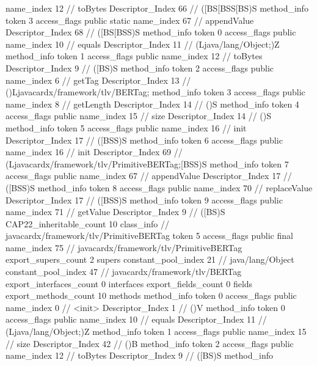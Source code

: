 {{{{{					name_index	12		// toBytes
					Descriptor_Index	66		// ([BS[BSS[BS)S
				}
				method_info {
					token	3
					access_flags	public static
					name_index	67		// appendValue
					Descriptor_Index	68		// ([BS[BSS)S
				}
				method_info {
					token	0
					access_flags	public
					name_index	10		// equals
					Descriptor_Index	11		// (Ljava/lang/Object;)Z
				}
				method_info {
					token	1
					access_flags	public
					name_index	12		// toBytes
					Descriptor_Index	9		// ([BS)S
				}
				method_info {
					token	2
					access_flags	public
					name_index	6		// getTag
					Descriptor_Index	13		// ()Ljavacardx/framework/tlv/BERTag;
				}
				method_info {
					token	3
					access_flags	public
					name_index	8		// getLength
					Descriptor_Index	14		// ()S
				}
				method_info {
					token	4
					access_flags	public
					name_index	15		// size
					Descriptor_Index	14		// ()S
				}
				method_info {
					token	5
					access_flags	public
					name_index	16		// init
					Descriptor_Index	17		// ([BSS)S
				}
				method_info {
					token	6
					access_flags	public
					name_index	16		// init
					Descriptor_Index	69		// (Ljavacardx/framework/tlv/PrimitiveBERTag;[BSS)S
				}
				method_info {
					token	7
					access_flags	public
					name_index	67		// appendValue
					Descriptor_Index	17		// ([BSS)S
				}
				method_info {
					token	8
					access_flags	public
					name_index	70		// replaceValue
					Descriptor_Index	17		// ([BSS)S
				}
				method_info {
					token	9
					access_flags	public
					name_index	71		// getValue
					Descriptor_Index	9		// ([BS)S
				}
			}
			CAP22_inheritable_count	10
		}
		class_info {		// javacardx/framework/tlv/PrimitiveBERTag
			token	5
			access_flags	public final
			name_index	75		// javacardx/framework/tlv/PrimitiveBERTag
			export_supers_count	2
			supers {
				constant_pool_index	21		// java/lang/Object
				constant_pool_index	47		// javacardx/framework/tlv/BERTag
			}
			export_interfaces_count	0
			interfaces {
			}
			export_fields_count	0
			fields {
			}
			export_methods_count	10
			methods {
				method_info {
					token	0
					access_flags	public
					name_index	0		// <init>
					Descriptor_Index	1		// ()V
				}
				method_info {
					token	0
					access_flags	public
					name_index	10		// equals
					Descriptor_Index	11		// (Ljava/lang/Object;)Z
				}
				method_info {
					token	1
					access_flags	public
					name_index	15		// size
					Descriptor_Index	42		// ()B
				}
				method_info {
					token	2
					access_flags	public
					name_index	12		// toBytes
					Descriptor_Index	9		// ([BS)S
				}
				method_info {
}}}}}
